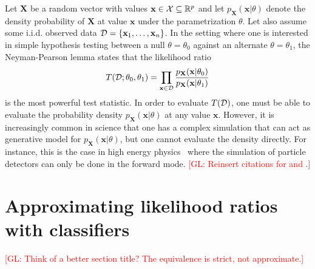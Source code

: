 \documentclass[12pt]{article}
\numberwithin{equation}{section}
\theoremstyle{plain}
\newcommand{\glnote}[1]{\textcolor{red}{[GL: #1]}}
\begin{document}
Let $\mathbf{X}$ be a random vector with values $\mathbf{x} \in {\cal X}
\subseteq \mathbb{R}^p$ and let $p_\mathbf{X}(\mathbf{x}|\theta)$ denote the
density probability of $\mathbf{X}$ at value $\mathbf{x}$ under the
parametrization $\theta$. Let also assume some i.i.d. observed data ${\cal D} = \{
\mathbf{x}_1, \dots, \mathbf{x}_n \}$. In the setting where one is interested in
simple hypothesis testing between a null $\theta=\theta_0$ against an alternate
$\theta=\theta_1$, the Neyman-Pearson lemma states that the likelihood ratio
\begin{equation}\label{eqn:likelihood-ratio-test}
T({\cal D}; \theta_0, \theta_1) = \prod_{\mathbf{x} \in {\cal D}} \frac{ p_\mathbf{X}(\mathbf{x}|\theta_0)}{ p_\mathbf{X}(\mathbf{x}|\theta_1)}
\end{equation}
is the most powerful test statistic. In order to evaluate $T({\cal D})$, one
must be able to evaluate the probability density $p_\mathbf{X}(\mathbf{x}|
\theta)$ at any value $\mathbf{x}$. However, it is increasingly common in
science that one has a complex simulation that can act as generative model for
$p_\mathbf{X}(\mathbf{x}|\theta)$, but one cannot evaluate the density directly.
For instance, this is the case in high energy physics~\citep{Neal:2007zz} where
the simulation of particle detectors can only be done in the forward mode.
\glnote{Reinsert citations for \cite{ClaytonScott} and \cite{JMLR:v14:tong13a}.}




\section{Approximating likelihood ratios with classifiers}
\label{sec:approx}

\glnote{Think of a better section title? The equivalence is strict, not approximate.}
\end{document}
